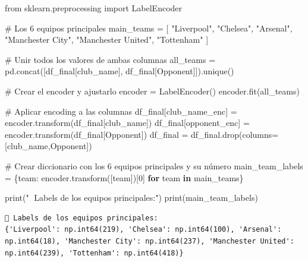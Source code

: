 \documentclass[
  letterpaper,
  DIV=11,
  numbers=noendperiod]{scrartcl}
\newenvironment{Shaded}{\begin{snugshade}}{\end{snugshade}}
\newcommand{\BuiltInTok}[1]{\textcolor[rgb]{0.00,0.23,0.31}{#1}}
\newcommand{\CommentTok}[1]{\textcolor[rgb]{0.37,0.37,0.37}{#1}}
\newcommand{\ControlFlowTok}[1]{\textcolor[rgb]{0.00,0.23,0.31}{\textbf{#1}}}
\newcommand{\DecValTok}[1]{\textcolor[rgb]{0.68,0.00,0.00}{#1}}
\newcommand{\ImportTok}[1]{\textcolor[rgb]{0.00,0.46,0.62}{#1}}
\newcommand{\KeywordTok}[1]{\textcolor[rgb]{0.00,0.23,0.31}{\textbf{#1}}}
\newcommand{\NormalTok}[1]{\textcolor[rgb]{0.00,0.23,0.31}{#1}}
\newcommand{\OperatorTok}[1]{\textcolor[rgb]{0.37,0.37,0.37}{#1}}
\newcommand{\StringTok}[1]{\textcolor[rgb]{0.13,0.47,0.30}{#1}}
\begin{document}
\begin{Shaded}
\begin{Highlighting}[]
\ImportTok{from}\NormalTok{ sklearn.preprocessing }\ImportTok{import}\NormalTok{ LabelEncoder}

\CommentTok{\# Los 6 equipos principales}
\NormalTok{main\_teams }\OperatorTok{=}\NormalTok{ [}
    \StringTok{"Liverpool"}\NormalTok{, }\StringTok{"Chelsea"}\NormalTok{, }\StringTok{"Arsenal"}\NormalTok{,}
    \StringTok{"Manchester City"}\NormalTok{, }\StringTok{"Manchester United"}\NormalTok{, }\StringTok{"Tottenham"}
\NormalTok{]}

\CommentTok{\# Unir todos los valores de ambas columnas}
\NormalTok{all\_teams }\OperatorTok{=}\NormalTok{ pd.concat([df\_final[}\StringTok{\textquotesingle{}club\_name\textquotesingle{}}\NormalTok{], df\_final[}\StringTok{\textquotesingle{}Opponent\textquotesingle{}}\NormalTok{]]).unique()}

\CommentTok{\# Crear el encoder y ajustarlo}
\NormalTok{encoder }\OperatorTok{=}\NormalTok{ LabelEncoder()}
\NormalTok{encoder.fit(all\_teams)}

\CommentTok{\# Aplicar encoding a las columnas}
\NormalTok{df\_final[}\StringTok{\textquotesingle{}club\_name\_enc\textquotesingle{}}\NormalTok{] }\OperatorTok{=}\NormalTok{ encoder.transform(df\_final[}\StringTok{\textquotesingle{}club\_name\textquotesingle{}}\NormalTok{])}
\NormalTok{df\_final[}\StringTok{\textquotesingle{}opponent\_enc\textquotesingle{}}\NormalTok{]  }\OperatorTok{=}\NormalTok{ encoder.transform(df\_final[}\StringTok{\textquotesingle{}Opponent\textquotesingle{}}\NormalTok{])}
\NormalTok{df\_final }\OperatorTok{=}\NormalTok{ df\_final.drop(columns}\OperatorTok{=}\NormalTok{[}\StringTok{\textquotesingle{}club\_name\textquotesingle{}}\NormalTok{,}\StringTok{\textquotesingle{}Opponent\textquotesingle{}}\NormalTok{])}

\CommentTok{\# Crear diccionario con los 6 equipos principales y su número}
\NormalTok{main\_team\_labels }\OperatorTok{=}\NormalTok{ \{team: encoder.transform([team])[}\DecValTok{0}\NormalTok{] }\ControlFlowTok{for}\NormalTok{ team }\KeywordTok{in}\NormalTok{ main\_teams\}}

\BuiltInTok{print}\NormalTok{(}\StringTok{"📌 Labels de los equipos principales:"}\NormalTok{)}
\BuiltInTok{print}\NormalTok{(main\_team\_labels)}
\end{Highlighting}
\end{Shaded}

\begin{verbatim}
📌 Labels de los equipos principales:
{'Liverpool': np.int64(219), 'Chelsea': np.int64(100), 'Arsenal': np.int64(18), 'Manchester City': np.int64(237), 'Manchester United': np.int64(239), 'Tottenham': np.int64(418)}
\end{verbatim}
\end{document}
